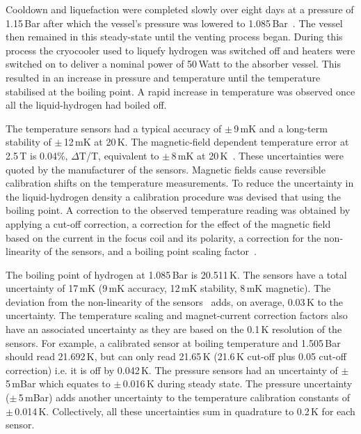 Cooldown and liquefaction were completed slowly over eight days at a
pressure of 1.15\,Bar after which the vessel's pressure was lowered to
1.085\,Bar~\cite{1748-0221-13-09-T09008}.
The vessel then remained in this steady-state until the
venting process began.
During this process the cryocooler used to liquefy hydrogen was
switched off and heaters were switched on to deliver a nominal power
of 50\,Watt to the absorber vessel.
This resulted in an increase in pressure and temperature until the
temperature stabilised at the boiling point.
A rapid increase in temperature was observed once all the
liquid-hydrogen had boiled off. 

The temperature sensors had a typical accuracy of
$\mathrm{\pm}$\,9\,mK and a long-term stability of
$\mathrm{\pm}$\,12\,mK at 20\,K.
The magnetic-field dependent temperature error at 2.5\,T is 0.04\%,
$\Delta$T/T, equivalent to $\mathrm{\pm}$\,8\,mK at
20\,K~\cite{CernoxRTDs,TemperatureMeasurement}.
These uncertainties were quoted by the manufacturer of the sensors.
Magnetic fields cause reversible calibration shifts on the temperature
measurements.
To reduce the uncertainty in the liquid-hydrogen density a calibration
procedure was devised that using the boiling point.
A correction to the observed temperature reading was obtained by
applying a cut-off correction, a correction for the effect of the
magnetic field based on the current in the focus coil and its
polarity, a correction for the non-linearity of the sensors, and a 
boiling point scaling factor~\cite{NOTE524}.  
 
The boiling point of hydrogen at 1.085\,Bar is 20.511\,K.
The sensors have a total uncertainty of 17\,mK (9\,mK accuracy, 12\,mK
stability, 8\,mK magnetic).
The deviation from the non-linearity of the sensors~\cite{CernoxRTDs,TemperatureMeasurement} adds, on average,
0.03\,K to the uncertainty.
The temperature scaling and magnet-current correction factors also
have an associated uncertainty as they are based on the 0.1\,K
resolution of the sensors.  
For example, a calibrated sensor at boiling temperature and 1.505\,Bar
should read 21.692\,K, but can only read 21.65\,K (21.6\,K cut-off
plus 0.05 cut-off correction) i.e. it is off by 0.042\,K.
The pressure sensors had an uncertainty of $\mathrm{\pm}$\,5\,mBar
which equates to $\mathrm{\pm}$\,0.016\,K during steady state.
The pressure uncertainty ($\mathrm{\pm}$\,5\,mBar) adds another
uncertainty to the temperature calibration constants of
$\mathrm{\pm}$\,0.014\,K.
Collectively, all these uncertainties sum in quadrature to 0.2\,K for
each sensor.
 
